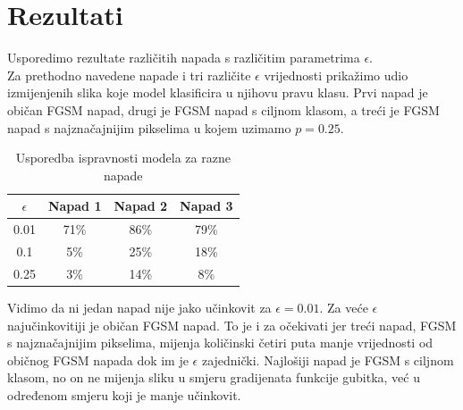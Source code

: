 \section{Rezultati}

Usporedimo rezultate različitih napada s različitim parametrima $\epsilon$. \\

Za prethodno navedene napade i tri različite $\epsilon$ vrijednosti prikažimo udio izmijenjenih slika koje model klasificira u njihovu pravu klasu. Prvi napad je običan FGSM napad, drugi je FGSM napad s ciljnom klasom, a treći je FGSM napad s najznačajnijim pikselima u kojem uzimamo $p = 0.25$.

\begin{table}[h!]
	\centering
	\begin{tabular}{||c || c | c | c||} 
		\hline
		$\epsilon$ & Napad 1 & Napad 2 & Napad 3 \\ [0.5ex] 
		\hline\hline
		0.01 & 71\% & 86\% & 79\% \\ 
		0.1 & 5\% & 25\% & 18\% \\
		0.25 & 3\% & 14\% & 8\% \\ [1ex] 
		\hline
	\end{tabular}
	\caption{Usporedba ispravnosti modela za razne napade}
\end{table}

Vidimo da ni jedan napad nije jako učinkovit za $\epsilon = 0.01$. Za veće $\epsilon$ najučinkovitiji je običan FGSM napad. To je i za očekivati jer treći napad, FGSM s najznačajnijim pikselima, mijenja količinski četiri puta manje vrijednosti od običnog FGSM napada dok im je $\epsilon$ zajednički. Najlošiji napad je FGSM s ciljnom klasom, no on ne mijenja sliku u smjeru gradijenata funkcije gubitka, već u određenom smjeru koji je manje učinkovit.